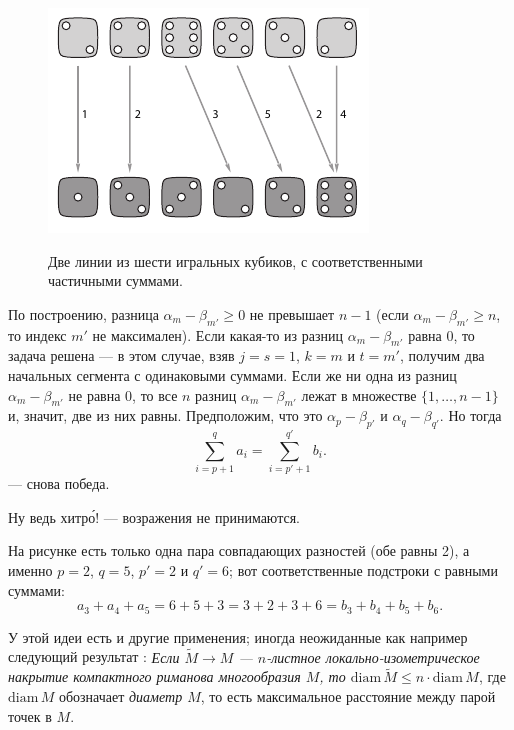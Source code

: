 \begin{figure}[h!]
\centering
\includegraphics[scale=1]{pics/kubiki}
\label{pic:kubiki}
\caption{Две линии из шести игральных кубиков, с соответственными частичными суммами.}
\end{figure}

По построению, разница $\alpha_m-\beta_{m'}\ge 0$ не превышает $n-1$ 
(если $\alpha_m-\beta_{m'}\ge n$, то индекс $m'$ не максимален).
Если какая-то из разниц $\alpha_m-\beta_{m'}$ равна $0$, то задача решена --- в этом случае, взяв $j=s=1$, $k=m$ и $t=m'$, получим два начальных сегмента с одинаковыми суммами.
Если же ни одна из разниц $\alpha_m-\beta_{m'}$ не равна $0$, то все $n$ разниц 
$\alpha_m-\beta_{m'}$ лежат в множестве $\{1,\dots,n-1\}$ и, значит, две из них равны.
Предположим, что это $\alpha_p-\beta_{p'}$ и $\alpha_q-\beta_{q'}$.
Но тогда 
\[\sum_{i=p+1}^qa_i=\sum_{i=p'+1}^{q'}b_i.\]
--- снова победа.

Ну ведь хитр\'{о}! --- возражения не принимаются.

На рисунке есть только одна пара совпадающих разностей (обе равны 2), а именно $p=2$, $q=5$, $p'=2$ и $q'=6$;
вот соответственные подстроки с равными суммами:
\[a_3+a_4+a_5=6+5+3=3+2+3+6=b_3+b_4+b_5+b_6.\]

\begin{addedbytheeditors}
У этой идеи есть и другие применения; иногда неожиданные как например следующий результат \cite{petrunin}:
\textit{Если $\tilde M\to M$ --- $n$-листное локально-изометрическое накрытие компактного риманова многообразия $M$, то $\mathrm{diam}\, \tilde M\le n\cdot \mathrm{diam}\, M$}, где $\mathrm{diam}\, M$ обозначает \textit{диаметр $M$}, то есть максимальное расстояние между парой точек в $M$.
\end{addedbytheeditors}
